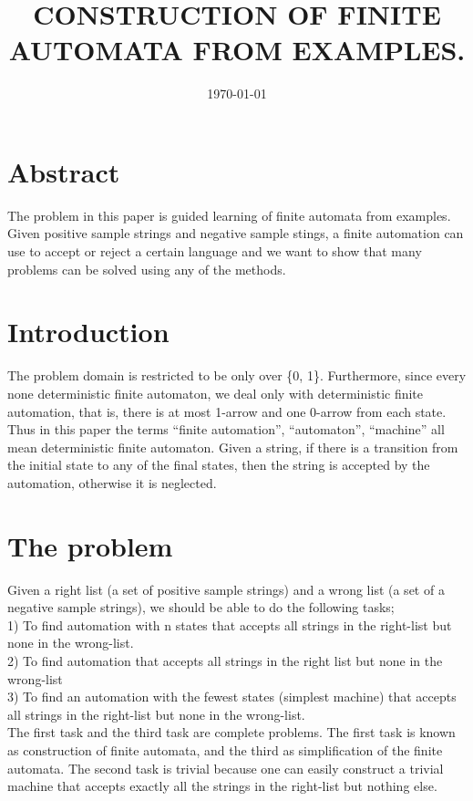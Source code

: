 \documentclass[14pt]{article}
\begin{document}
\title{CONSTRUCTION OF FINITE AUTOMATA FROM EXAMPLES.}


\date{\today}
\maketitle
\section{Abstract}
The problem in this paper is guided learning of finite automata from examples. Given positive sample strings and negative sample stings, a finite automation can use to accept or reject a certain language and we want to show that many problems can be solved using any of the methods.
\section{Introduction}
The problem domain is restricted to be only over \{0, 1\}. Furthermore, since every none deterministic finite automaton, we deal only with deterministic finite automation, that is, there is at most 1-arrow and one 0-arrow from each state. Thus in this paper the terms “finite automation'', “automaton”, “machine” all mean deterministic finite automaton.
 Given a string, if there is a transition from the initial state to any of the final states, then the string is accepted by the automation, otherwise it is neglected.
\section{The problem}
Given a right list (a set of positive sample strings) and a wrong list (a set of a negative sample strings), we should be able to do the following tasks;\\
1)	To find automation with n states that accepts all strings in the right-list but none in the wrong-list.\\
2)	To find automation that accepts all strings in the right list but none in the wrong-list\\
3)	To find an automation with the fewest states (simplest machine) that accepts all strings in the right-list but none in the wrong-list.\\
The first task and the third task are complete problems. The first task is known as construction of finite automata, and the third as simplification of the finite automata.
The second task is trivial because one can easily construct a trivial machine that accepts exactly all the strings in the right-list but nothing else.
 
\end{document}
